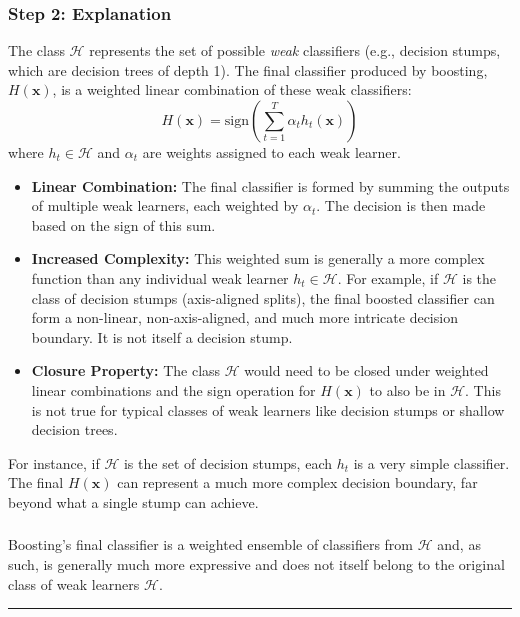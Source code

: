 \documentclass{article}
\begin{document}
\subsubsection*{Step 2: Explanation}
\parbox{\textwidth}{
The class $\mathcal H$ represents the set of possible \emph{weak} classifiers (e.g., decision stumps, which are decision trees of depth 1). The final classifier produced by boosting, $H(\mathbf{x})$, is a weighted linear combination of these weak classifiers:
$$ H(\mathbf{x}) = \text{sign}\left(\sum_{t=1}^T \alpha_t h_t(\mathbf{x})\right) $$
where $h_t \in \mathcal H$ and $\alpha_t$ are weights assigned to each weak learner.
\begin{itemize}
    \item \textbf{Linear Combination:} The final classifier is formed by summing the outputs of multiple weak learners, each weighted by $\alpha_t$. The decision is then made based on the sign of this sum.
    \item \textbf{Increased Complexity:} This weighted sum is generally a more complex function than any individual weak learner $h_t \in \mathcal H$. For example, if $\mathcal H$ is the class of decision stumps (axis-aligned splits), the final boosted classifier can form a non-linear, non-axis-aligned, and much more intricate decision boundary. It is not itself a decision stump.
    \item \textbf{Closure Property:} The class $\mathcal H$ would need to be closed under weighted linear combinations and the sign operation for $H(\mathbf{x})$ to also be in $\mathcal H$. This is not true for typical classes of weak learners like decision stumps or shallow decision trees.
\end{itemize}
For instance, if $\mathcal{H}$ is the set of decision stumps, each $h_t$ is a very simple classifier. The final $H(\mathbf{x})$ can represent a much more complex decision boundary, far beyond what a single stump can achieve.
}

\subsubsection*{}
\parbox{\textwidth}{
Boosting's final classifier is a weighted ensemble of classifiers from $\mathcal H$ and, as such, is generally much more expressive and does not itself belong to the original class of weak learners $\mathcal H$.
}

\noindent\rule{\textwidth}{0.4pt}
\end{document}
